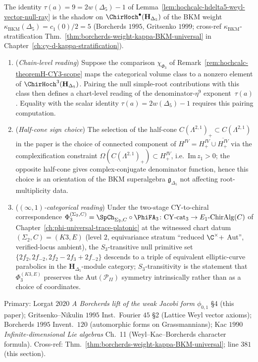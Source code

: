 \begin{remark}
\label{rem:hochcalc-null-ray-bkm-shadow}
The identity $\tau(a) = 9 = 2 w(\Delta_5) - 1$ of
Lemma~\ref{lem:hochcalc-hdelta5-weyl-vector-null-ray} is the shadow on
$\ChirHoch^\bullet(\mathbf H_{\Delta_5})$ of the BKM weight
$\kappa_{\mathrm{BKM}}(\Delta_5) = c_1(0)/2 = 5$
(Borcherds $1995$, Gritsenko $1999$; cross-ref
$\kappa_{\mathrm{BKM}}$-stratification Thm.\ \ref{thm:borcherds-weight-kappa-BKM-universal}
in Chapter~\ref{ch:cy-d-kappa-stratification}).
\begin{enumerate}[label=(\alph*),leftmargin=1.5em]
\item (\emph{Chain-level reading}) Suppose the comparison
$\chi_{\Phi_3}$ of Remark~\ref{rem:hochcalc-theoremH-CY3-scope}
maps the categorical volume class to a nonzero element of
$\ChirHoch^3(\mathbf H_{\Delta_5})$.  Pairing the null simple-root
contributions with this class then defines a chart-level reading of
the denominator-$\eta^9$ exponent~$\tau(a)$.  Equality with the scalar
identity $\tau(a)=2w(\Delta_5)-1$ requires this pairing computation.
\item (\emph{Half-cone sign choice}) The selection of the half-cone
$C(\Lambda^{2,1})_+ \subset C(\Lambda^{2,1})$ in the paper is the
choice of connected component of $H^{IV} = H^{IV}_+ \cup \overline{H^{IV}_+}$
via the complexification constraint
$\Omega(C(\Lambda^{2,1})_+) \subset H^{IV}_+$, i.e.\ $\mathrm{Im}\, z_1 > 0$;
the opposite half-cone gives complex-conjugate denominator function,
hence this choice is an orientation of the BKM superalgebra
$\mathfrak g_{\Delta_5}$ not affecting root-multiplicity data.
\item (\emph{$(\infty,1)$-categorical reading}) Under the two-stage
CY-to-chiral correspondence
$\Phi_3^{(\Sigma_2, C)}=\SpCh_{\Sigma_2, C}\circ\PhiFA_3
\colon \mathrm{CY}\text{-cat}_3 \to E_1\text{-}\mathrm{ChirAlg}(C)$
of Chapter~\ref{ch:phi-universal-trace-platonic} at the witnessed
chart datum $(\Sigma_2, C) = (K3, E)$ (level $2$, equivariance stratum
``reduced $\C^\times +$ Aut'', verified-locus ambient), the
$S_3$-transitive null primitive set
$\{2 f_2, 2 f_{-2}, 2 f_2 - 2 f_3 + 2 f_{-2}\}$ descends to a triple
of equivalent elliptic-curve parabolics in the
$\mathbf H_{\Delta_5}$-module category; $S_3$-transitivity is the
statement that $\Phi_3^{(K3, E)}$ preserves the
$\mathrm{Aut}(\mathcal P_{II})$ symmetry intrinsically rather than as
a choice of coordinates.
\end{enumerate}
Primary: Lorgat $2020$ \emph{A Borcherds lift of the weak Jacobi
form $\phi_{0,1}$} \S 4 (this paper); Gritsenko--Nikulin $1995$
Inst.\ Fourier $45$ \S 2 (Lattice Weyl vector axioms);
Borcherds $1995$ Invent.\ $120$ (automorphic forms on Grassmannians);
Kac $1990$ \emph{Infinite-dimensional Lie algebras} Ch.\ 11
(Weyl--Kac--Borcherds character formula).
Cross-ref:
\cite{VolI}
Thm.\ \ref{thm:borcherds-weight-kappa-BKM-universal};
\cite{VolI} line $381$ (this section).
\end{remark}

